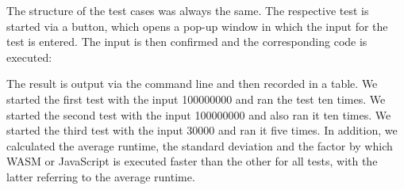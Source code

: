 The structure of the test cases was always the same. The respective test is started via a button, which opens a pop-up window in which the input for the test is entered. The input is then confirmed and the corresponding code is executed:

The result is output via the command line and then recorded in a table.
We started the first test with the input 100000000 and ran the test ten times.
We started the second test with the input 100000000 and also ran it ten times.
We started the third test with the input 30000 and ran it five times.
In addition, we calculated the average runtime, the standard deviation and the factor by which WASM or JavaScript is executed faster than the other for all tests, with the latter referring to the average runtime.

